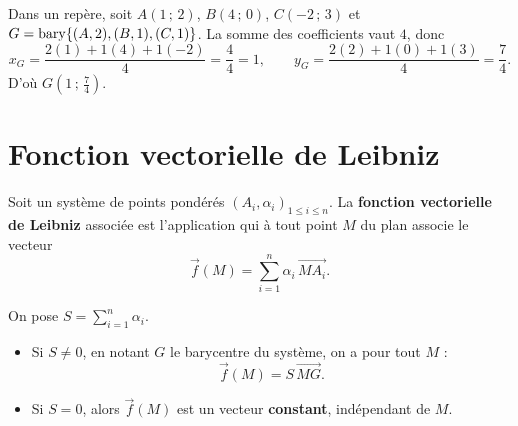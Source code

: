 \begin{exemple}
Dans un repère, soit $A(1\,;\,2)$, $B(4\,;\,0)$, $C(-2\,;\,3)$ et
$G=\operatorname{bary}\{(A,2),(B,1),(C,1)\}$. La somme des coefficients vaut $4$, donc
\[ x_G=\frac{2(1)+1(4)+1(-2)}{4}=\frac{4}{4}=1,\qquad
   y_G=\frac{2(2)+1(0)+1(3)}{4}=\frac{7}{4}. \]
D'où $G\!\left(1\,;\,\tfrac74\right)$.
\end{exemple}

\begin{illus}
\end{illus}

\section{Fonction vectorielle de Leibniz}

\begin{definition}
Soit un système de points pondérés $(A_i,\alpha_i)_{1\le i\le n}$. La \textbf{fonction
vectorielle de Leibniz} associée est l'application qui à tout point $M$ du plan associe
le vecteur
\[ \vec{f}(M)=\sum_{i=1}^{n}\alpha_i\,\vec{MA_i}. \]
\end{definition}

\begin{theoreme}
On pose $S=\displaystyle\sum_{i=1}^{n}\alpha_i$.
\begin{itemize}
  \item Si $S\neq 0$, en notant $G$ le barycentre du système, on a pour tout $M$ :
        \[ \vec{f}(M)=S\,\vec{MG}. \]
  \item Si $S=0$, alors $\vec{f}(M)$ est un vecteur \textbf{constant}, indépendant
        de $M$.
\end{itemize}
\end{theoreme}


